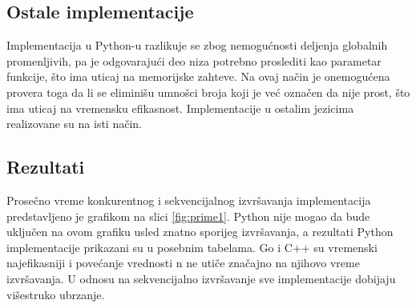 \documentclass[12pt,oneside]{memoir}
\begin{document}
\subsection{Ostale implementacije}
Implementacija u Python-u razlikuje se zbog nemogućnosti deljenja globalnih promenljivih, pa je odgovarajući deo niza potrebno proslediti kao parametar funkcije, što ima uticaj na memorijske zahteve. Na ovaj način je onemogućena provera toga da li se eliminišu umnošci broja koji je već označen da nije prost, što ima uticaj na vremensku efikasnost. Implementacije u ostalim jezicima realizovane su na isti način.

\subsection{Rezultati}

Prosečno vreme konkurentnog i sekvencijalnog izvršavanja implementacija predstavljeno je grafikom na slici \ref{fig:prime1}. Python nije mogao da bude uključen na ovom grafiku usled znatno sporijeg izvršavanja, a rezultati Python implementacije prikazani su u posebnim tabelama. Go i C++ su vremenski najefikasniji i povećanje vrednosti n ne utiče značajno na njihovo vreme izvršavanja. U odnosu na sekvencijalno izvršavanje sve implementacije dobijaju višestruko ubrzanje. 

\end{document}
